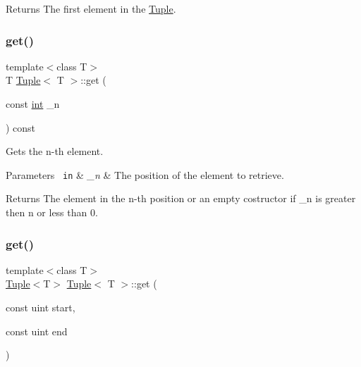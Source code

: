 \begin{DoxyReturn}{Returns}
The first element in the {\ttfamily \mbox{\hyperlink{class_tuple}{Tuple}}}. 
\end{DoxyReturn}
\mbox{\label{class_tuple_aabf82c5d0f19c9a8f6a8f01d95801162}} 
\subsubsection{\texorpdfstring{get()}{get()}\hspace{0.1cm}{\footnotesize\ttfamily [1/2]}}
{\footnotesize\ttfamily template$<$class T$>$ \\
T \mbox{\hyperlink{class_tuple}{Tuple}}$<$ T $>$\+::get (\begin{DoxyParamCaption}\item[{const \mbox{\hyperlink{draw_8hh_aa620a13339ac3a1177c86edc549fda9b}{int}}}]{\+\_\+n }\end{DoxyParamCaption}) const\hspace{0.3cm}{\ttfamily [inline]}}



Gets the n-\/th element. 


\begin{DoxyParams}[1]{Parameters}
\mbox{\texttt{ in}}  & {\em \+\_\+n} & The position of the element to retrieve. \\
\hline
\end{DoxyParams}
\begin{DoxyReturn}{Returns}
The element in the n-\/th position or an empty costructor if \+\_\+n is greater then n or less than 0. 
\end{DoxyReturn}
\mbox{\label{class_tuple_a7cd0c2fb33a5861e3f171614881393ce}} 
\subsubsection{\texorpdfstring{get()}{get()}\hspace{0.1cm}{\footnotesize\ttfamily [2/2]}}
{\footnotesize\ttfamily template$<$class T$>$ \\
\mbox{\hyperlink{class_tuple}{Tuple}}$<$T$>$ \mbox{\hyperlink{class_tuple}{Tuple}}$<$ T $>$\+::get (\begin{DoxyParamCaption}\item[{const uint}]{start,  }\item[{const uint}]{end }\end{DoxyParamCaption})\hspace{0.3cm}{\ttfamily [inline]}}



